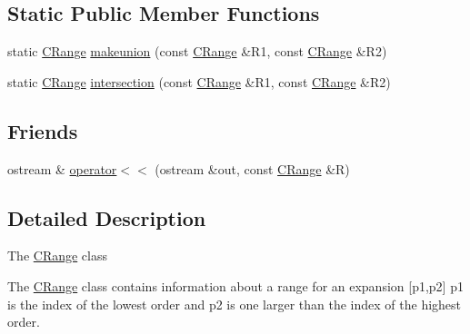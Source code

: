 \subsection*{Static Public Member Functions}
\begin{DoxyCompactItemize}
\item 
static \hyperlink{classCRange}{C\-Range} \hyperlink{classCRange_af9d1231238478fa4a9edfc2ea7f81372}{makeunion} (const \hyperlink{classCRange}{C\-Range} \&R1, const \hyperlink{classCRange}{C\-Range} \&R2)
\item 
static \hyperlink{classCRange}{C\-Range} \hyperlink{classCRange_a589cce90cd0bc2766c3b08f7f3d1175a}{intersection} (const \hyperlink{classCRange}{C\-Range} \&R1, const \hyperlink{classCRange}{C\-Range} \&R2)
\end{DoxyCompactItemize}
\subsection*{Friends}
\begin{DoxyCompactItemize}
\item 
ostream \& \hyperlink{classCRange_a928efec3b48ede05120f92a548f86b69}{operator$<$$<$} (ostream \&out, const \hyperlink{classCRange}{C\-Range} \&R)
\end{DoxyCompactItemize}


\subsection{Detailed Description}
The \hyperlink{classCRange}{C\-Range} class

The \hyperlink{classCRange}{C\-Range} class contains information about a range for an expansion \mbox{[}p1,p2\mbox{]} p1 is the index of the lowest order and p2 is one larger than the index of the highest order. 

